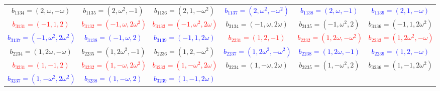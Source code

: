 \documentclass[%
  reprint,
  superscriptaddress,
  showpacs,
  showkeys,
  amsmath,amssymb,
  pra,
  longbibliography,
  floatfix,
  x11names
]{revtex4-2}
\begin{document}
\begin{table}[htbp!]
\begin{ruledtabular}
\begin{tabular}{*{6}{c}}
\textcolor{green!40!black}{$b_{1134}=(2,\omega,-\omega)$} & \textcolor{green!40!black}{$b_{1135}=(2,\omega^2,-1)$} & \textcolor{green!40!black}{$b_{1136}=(2,1,-\omega^2)$} & \textcolor{blue}{$b_{1137}=(2,\omega^2,-\omega^2)$} & \textcolor{blue}{$b_{1138}=(2,\omega,-1)$} & \textcolor{blue}{$b_{1139}=(2,1,-\omega)$} \\
\textcolor{red}{$b_{3131}=(-1,1,2)$} & \textcolor{red}{$b_{3132}=(-1,\omega,2\omega^2)$} & \textcolor{red}{$b_{3133}=(-1,\omega^2,2\omega)$} & \textcolor{green!40!black}{$b_{3134}=(-1,\omega,2\omega)$} & \textcolor{green!40!black}{$b_{3135}=(-1,\omega^2,2)$} & \textcolor{green!40!black}{$b_{3136}=(-1,1,2\omega^2)$} \\
\textcolor{blue}{$b_{3137}=(-1,\omega^2,2\omega^2)$} & \textcolor{blue}{$b_{3138}=(-1,\omega,2)$} & \textcolor{blue}{$b_{3139}=(-1,1,2\omega)$} & \textcolor{red}{$b_{2231}=(1,2,-1)$} & \textcolor{red}{$b_{2232}=(1,2\omega,-\omega^2)$} & \textcolor{red}{$b_{2233}=(1,2\omega^2,-\omega)$} \\
\textcolor{green!40!black}{$b_{2234}=(1,2\omega,-\omega)$} & \textcolor{green!40!black}{$b_{2235}=(1,2\omega^2,-1)$} & \textcolor{green!40!black}{$b_{2236}=(1,2,-\omega^2)$} & \textcolor{blue}{$b_{2237}=(1,2\omega^2,-\omega^2)$} & \textcolor{blue}{$b_{2238}=(1,2\omega,-1)$} & \textcolor{blue}{$b_{2239}=(1,2,-\omega)$} \\
\textcolor{red}{$b_{3231}=(1,-1,2)$} & \textcolor{red}{$b_{3232}=(1,-\omega,2\omega^2)$} & \textcolor{red}{$b_{3233}=(1,-\omega^2,2\omega)$} & \textcolor{green!40!black}{$b_{3234}=(1,-\omega,2\omega)$} & \textcolor{green!40!black}{$b_{3235}=(1,-\omega^2,2)$} & \textcolor{green!40!black}{$b_{3236}=(1,-1,2\omega^2)$} \\
\textcolor{blue}{$b_{3237}=(1,-\omega^2,2\omega^2)$} & \textcolor{blue}{$b_{3238}=(1,-\omega,2)$} & \textcolor{blue}{$b_{3239}=(1,-1,2\omega)$} & & & \\
\end{tabular}
\end{ruledtabular}
\end{table}
\end{document}
